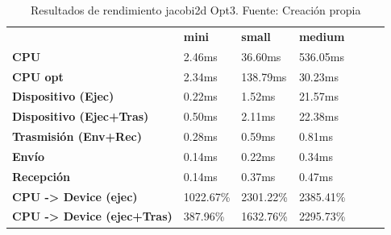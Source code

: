 \begin{table}[H]
    \centering
    \begin{tabular}{lllllll}
    \rowcolor[HTML]{DAE8FC} \ &  \textbf{mini} &  \textbf{	small} &  \textbf{	medium} \\
    \cellcolor[HTML]{DAE8FC} \textbf{CPU} & 2.46ms & 	36.60ms & 	536.05ms \\
    \rowcolor[HTML]{EFEFEF} \cellcolor[HTML]{DAE8FC} \textbf{CPU opt} & 2.34ms & 	138.79ms & 	30.23ms \\
    \cellcolor[HTML]{DAE8FC} \textbf{Dispositivo (Ejec)} & 0.22ms & 	1.52ms & 	21.57ms \\
    \rowcolor[HTML]{EFEFEF} \cellcolor[HTML]{DAE8FC} \textbf{Dispositivo (Ejec+Tras)} & 0.50ms & 	2.11ms & 	22.38ms \\
    \cellcolor[HTML]{DAE8FC} \textbf{Trasmisión (Env+Rec)} & 0.28ms & 	0.59ms & 	0.81ms \\
    \rowcolor[HTML]{EFEFEF} \cellcolor[HTML]{DAE8FC} \textbf{Envío} & 0.14ms & 	0.22ms & 	0.34ms \\
    \cellcolor[HTML]{DAE8FC} \textbf{Recepción} & 0.14ms & 	0.37ms & 	0.47ms \\
    \rowcolor[HTML]{EFEFEF} \cellcolor[HTML]{DAE8FC} \textbf{CPU -> Device (ejec)} & 1022.67\% & 	2301.22\% & 	2385.41\% \\
    \cellcolor[HTML]{DAE8FC} \textbf{CPU -> Device (ejec+Tras)} & 387.96\% & 	1632.76\% & 	2295.73\% \\
    \end{tabular}
    \caption[Resultados de rendimiento jacobi2d Opt3]{{Resultados de rendimiento jacobi2d Opt3. Fuente: Creación propia}}
    \label{table_test_jacobi2d_Opt3_hw_performanceResults}
\end{table}